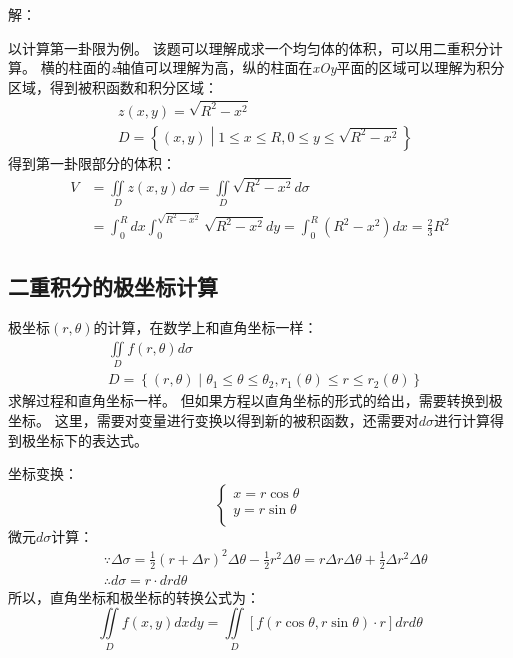 解：

以计算第一卦限为例。
该题可以理解成求一个均匀体的体积，可以用二重积分计算。
横的柱面的{\it z}轴值可以理解为高，纵的柱面在{\it xOy}平面的区域可以理解为积分区域，得到被积函数和积分区域：
\begin{align*}
&z\left( x,y \right) =\sqrt{R^2-x^2} \\
&D=\left\{ \left( x,y \right) \middle| 1\leqslant x\leqslant R,0\leqslant y\leqslant \sqrt{R^2-x^2} \right\}
\end{align*}
得到第一卦限部分的体积：
\begin{align*}
V&=\iint\limits_D{z\left( x,y \right) d\sigma}=\iint\limits_D{\sqrt{R^2-x^2}d\sigma} \\
&=\int_0^R{dx\int_0^{\sqrt{R^2-x^2}}{\sqrt{R^2-x^2}dy}}=\int_0^R{\left( R^2-x^2 \right) dx}=\frac{2}{3}R^2
\end{align*}

\subsection{二重积分的极坐标计算}

极坐标$\left( r,\theta \right) $的计算，在数学上和直角坐标一样：
\begin{align*}
&\iint\limits_D{f\left( r,\theta \right) d\sigma} \\
&D=\left\{ \left( r,\theta \right) \middle| \theta _1\leqslant \theta \leqslant \theta _2,r_1\left( \theta \right) \leqslant r\leqslant r_2\left( \theta \right) \right\}
\end{align*}
求解过程和直角坐标一样。
但如果方程以直角坐标的形式的给出，需要转换到极坐标。
这里，需要对变量进行变换以得到新的被积函数，还需要对$d\sigma $进行计算得到极坐标下的表达式。

坐标变换：
\[
\begin{cases}
	x=r\cos \theta\\
	y=r\sin \theta\\
\end{cases}
\]
微元$d\sigma $计算：
\begin{align*}
&\because \Delta \sigma =\frac{1}{2}\left( r+\Delta r \right) ^2\Delta \theta -\frac{1}{2}r^2\Delta \theta =r\Delta r\Delta \theta +\frac{1}{2}\Delta r^2\Delta \theta \\
&\therefore d\sigma =r\cdot drd\theta
\end{align*}
所以，直角坐标和极坐标的转换公式为：
\[
\iint\limits_D{f\left( x,y \right) dxdy}=\iint\limits_D{\left[ f\left( r\cos \theta ,r\sin \theta \right) \cdot r \right] drd\theta}
\]

